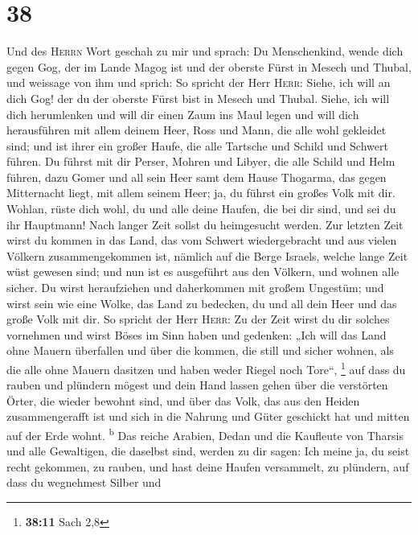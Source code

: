 \hypertarget{section-37}{%
\section{38}\label{section-37}}

 Und des \textsc{Herrn} Wort geschah zu mir und sprach:
 Du Menschenkind, wende dich gegen Gog, der im Lande Magog
ist und der oberste Fürst in Mesech und Thubal, und weissage von ihm
 und sprich: So spricht der Herr \textsc{Herr}: Siehe, ich
will an dich Gog! der du der oberste Fürst bist in Mesech und Thubal.
 Siehe, ich will dich herumlenken und will dir einen Zaum
ins Maul legen und will dich herausführen mit allem deinem Heer, Ross
und Mann, die alle wohl gekleidet sind; und ist ihrer ein großer Haufe,
die alle Tartsche und Schild und Schwert führen.  Du
führst mit dir Perser, Mohren und Libyer, die alle Schild und Helm
führen,  dazu Gomer und all sein Heer samt dem Hause
Thogarma, das gegen Mitternacht liegt, mit allem seinem Heer; ja, du
führst ein großes Volk mit dir.  Wohlan, rüste dich wohl,
du und alle deine Haufen, die bei dir sind, und sei du ihr Hauptmann!
 Nach langer Zeit sollst du heimgesucht werden. Zur
letzten Zeit wirst du kommen in das Land, das vom Schwert wiedergebracht
und aus vielen Völkern zusammengekommen ist, nämlich auf die Berge
Israels, welche lange Zeit wüst gewesen sind; und nun ist es ausgeführt
aus den Völkern, und wohnen alle sicher.  Du wirst
heraufziehen und daherkommen mit großem Ungestüm; und wirst sein wie
eine Wolke, das Land zu bedecken, du und all dein Heer und das große
Volk mit dir.  So spricht der Herr \textsc{Herr}: Zu der
Zeit wirst du dir solches vornehmen und wirst Böses im Sinn haben
 und gedenken: „Ich will das Land ohne Mauern überfallen
und über die kommen, die still und sicher wohnen, als die alle ohne
Mauern dasitzen und haben weder Riegel noch Tore``, \footnote{\textbf{38:11}
  Sach 2,8}  auf dass du rauben und plündern mögest und
dein Hand lassen gehen über die verstörten Örter, die wieder bewohnt
sind, und über das Volk, das aus den Heiden zusammengerafft ist und sich
in die Nahrung und Güter geschickt hat und mitten auf der Erde wohnt.
\textsuperscript{b}  Das reiche Arabien, Dedan und die
Kaufleute von Tharsis und alle Gewaltigen, die daselbst sind, werden zu
dir sagen: Ich meine ja, du seist recht gekommen, zu rauben, und hast
deine Haufen versammelt, zu plündern, auf dass du wegnehmest Silber und
